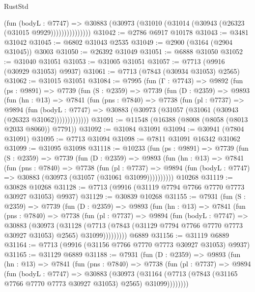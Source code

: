 \begin{lexlean}{RustStd}
\begin{coremodule}
                    (fun (bodyL : @7747) =>
                    @30883 (@30973 (@31010 (@31014 (@30943 (@26323 (@31015 @9929)))))))))))))))
@31042 := @2786 @6917 @10178
@31043 := @3481 @31042
@31045 := @6802 @31043 @2535
@31049 := @2900 (@3164 (@2904 @31045)) @3003
@31050 := @26392 @31049
@31051 := @6888 @31050
@31052 := @31040 @31051
@31053 := @31005 @31051
@31057 := @7713 (@9916 (@30929 @31053) @9937)
@31061 := @7713 (@7843 (@30934 @31053) @2565)
@31062 := @31015 @31051
@31084 := @7995
    (fun (Γ : @7743) =>
    @9892
      (fun (ps : @9891) =>
      @7739
        (fun (S : @2359) =>
        @7739
          (fun (D : @2359) =>
          @9893
            (fun (hn : @13) =>
            @7841
              (fun (pns : @7840) =>
              @7738
                (fun (pl : @7737) =>
                @9894
                  (fun (bodyL : @7747) =>
                  @30883 (@30973 (@31057 (@31061 (@30943 (@26323 @31062)))))))))))))
@31091 := @11548 (@16388 (@8008 (@8058 (@8013 @2033 @8060)) @7791))
@31092 := @31084 @31091
@31094 := @30941 (@7804 @31091)
@31095 := @7713 @31094
@31098 := @7811 @31091 @16342 @31062
@31099 := @31095 @31098
@31118 := @10233
    (fun (ps : @9891) =>
    @7739
      (fun (S : @2359) =>
      @7739
        (fun (D : @2359) =>
        @9893
          (fun (hn : @13) =>
          @7841
            (fun (pns : @7840) =>
            @7738
              (fun (pl : @7737) =>
              @9894 (fun (bodyL : @7747) => @30883 (@30973 (@31057 (@31061 @31099))))))))))
    @10268
@31119 := @30828 @10268
@31128 := @7713 (@9916 (@31119 @7794 @7766 @7770 @7773 @30927 @31053) @9937)
@31129 := @30839 @10268
@31155 := @7931
    (fun (S : @2359) =>
    @7739
      (fun (D : @2359) =>
      @9893
        (fun (hn : @13) =>
        @7841
          (fun (pns : @7840) =>
          @7738
            (fun (pl : @7737) =>
            @9894
              (fun (bodyL : @7747) =>
              @30883
                (@30973
                  (@31128
                    (@7713
                      (@7843 (@31129 @7794 @7766 @7770 @7773 @30927 @31053) @2565)
                      @31099)))))))))
    @6889
@31156 := @31119 @6889
@31164 := @7713 (@9916 (@31156 @7766 @7770 @7773 @30927 @31053) @9937)
@31165 := @31129 @6889
@31188 := @7931
    (fun (D : @2359) =>
    @9893
      (fun (hn : @13) =>
      @7841
        (fun (pns : @7840) =>
        @7738
          (fun (pl : @7737) =>
          @9894
            (fun (bodyL : @7747) =>
            @30883
              (@30973
                (@31164 (@7713 (@7843 (@31165 @7766 @7770 @7773 @30927 @31053) @2565) @31099))))))))

\end{coremodule}
\end{lexlean}
